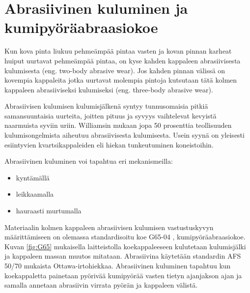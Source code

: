 \documentclass[12pt,a4paper,finnish]{tutthesis}
\begin{document}
\chapter{Abrasiivinen kuluminen ja kumipyöräabraasiokoe}
\label{ch:kumip}


Kun kova pinta liukuu pehmeämpää pintaa vasten ja kovan pinnan
karheat huiput uurtavat pehmeämpää pintaa, on kyse kahden kappaleen abrasiivisesta kulumisesta
(eng. two-body abrasive wear). Jos kahden pinnan välissä on kovempia kappaleita
jotka uurtavat molempia pintoja kutsutaan tätä kolmen kappaleen
abrasiiviseksi kulumiseksi (eng. three-body abrasive wear).

Abrasiivisen kulumisen kulumisjälkenä syntyy tunnusomaisia
pitkiä samansuuntaisia uurteita, joitten pituus ja syvyys vaihtelevat
kevyistä naarmuista syviin uriin. Williamsin \parencite*[s.~179]{williamsengineering}
mukaan jopa 50 prosenttia teollisuuden kulumisongelmista
aiheutuu abrasiivisesta kulumisesta. Usein syynä on yleisesti
esiintyvien kvartsikappaleiden eli hiekan tunkeutuminen koneistoihin.

Abrasiivinen kuluminen voi tapahtua eri mekanismeilla:

\begin{itemize}
\item kyntämällä
\item leikkaamalla
\item hauraasti murtumalla \parencite[s.~109]{kivioja1997}
\end{itemize}


Materiaalin kolmen kappaleen abrasiivisen kulumisen vastustuskyvyn määrittämiseen
on olemassa standardisoitu koe G65-04 \parencite{Standard2010},
kumipyöräabraasiokoe.
Kuvan \ref{fig:G65} mukaisella laitteistolla koekappaleeseen
kulutetaan kulumisjälki ja kappaleen massan muutos mitataan. Abrasiivina
käytetään standardin AFS 50/70 \parencite{foundrysand} mukaista Ottawa-irtohiekkaa.
Abrasiivinen kuluminen tapahtuu kun koekappaletta painetaan pyörivää
kumipyörää vasten tietyn ajanjakson ajan ja samalla annetaan abrasiivin virrata pyörän ja kappaleen
välistä.
\end{document}
